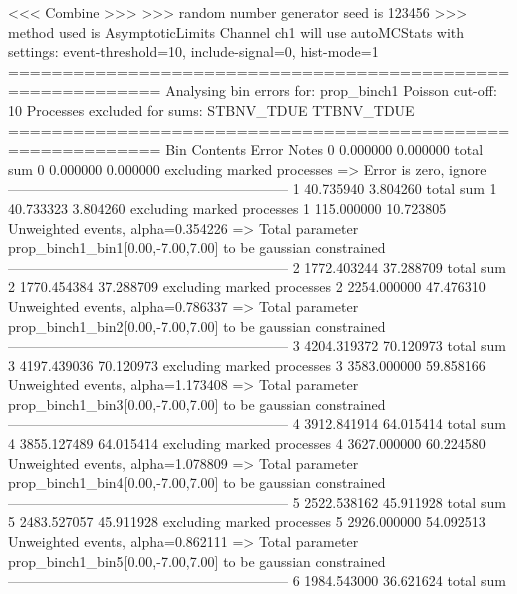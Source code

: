  <<< Combine >>> 
>>> random number generator seed is 123456
>>> method used is AsymptoticLimits
Channel ch1 will use autoMCStats with settings: event-threshold=10, include-signal=0, hist-mode=1
============================================================
Analysing bin errors for: prop_binch1
Poisson cut-off: 10
Processes excluded for sums: STBNV_TDUE TTBNV_TDUE
============================================================
Bin        Contents        Error           Notes                         
0          0.000000        0.000000        total sum                     
0          0.000000        0.000000        excluding marked processes    
  => Error is zero, ignore      
------------------------------------------------------------
1          40.735940       3.804260        total sum                     
1          40.733323       3.804260        excluding marked processes    
1          115.000000      10.723805       Unweighted events, alpha=0.354226
  => Total parameter prop_binch1_bin1[0.00,-7.00,7.00] to be gaussian constrained
------------------------------------------------------------
2          1772.403244     37.288709       total sum                     
2          1770.454384     37.288709       excluding marked processes    
2          2254.000000     47.476310       Unweighted events, alpha=0.786337
  => Total parameter prop_binch1_bin2[0.00,-7.00,7.00] to be gaussian constrained
------------------------------------------------------------
3          4204.319372     70.120973       total sum                     
3          4197.439036     70.120973       excluding marked processes    
3          3583.000000     59.858166       Unweighted events, alpha=1.173408
  => Total parameter prop_binch1_bin3[0.00,-7.00,7.00] to be gaussian constrained
------------------------------------------------------------
4          3912.841914     64.015414       total sum                     
4          3855.127489     64.015414       excluding marked processes    
4          3627.000000     60.224580       Unweighted events, alpha=1.078809
  => Total parameter prop_binch1_bin4[0.00,-7.00,7.00] to be gaussian constrained
------------------------------------------------------------
5          2522.538162     45.911928       total sum                     
5          2483.527057     45.911928       excluding marked processes    
5          2926.000000     54.092513       Unweighted events, alpha=0.862111
  => Total parameter prop_binch1_bin5[0.00,-7.00,7.00] to be gaussian constrained
------------------------------------------------------------
6          1984.543000     36.621624       total sum                     
